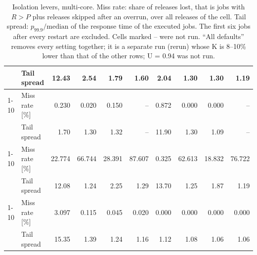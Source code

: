 \begin{table}[ht]
{\begin{tabular}{ll|rrrr|rrrr}
 & Tail spread & 12.43 & 2.54 & 1.79 & 1.60 & 2.04 & 1.30 & 1.30 & 1.19 \\
\cmidrule{1-10}
\multirow[t]{2}{*}{all defaults} & Miss rate [\%] & 0.230 & 0.020 & 0.150 & -- & 0.872 & 0.000 & 0.000 & -- \\
 & Tail spread & 1.70 & 1.30 & 1.32 & -- & 11.90 & 1.30 & 1.09 & -- \\
\cmidrule{1-10}
\multirow[t]{2}{*}{SMT enabled} & Miss rate [\%] & 22.774 & 66.744 & 28.391 & 87.607 & 0.325 & 62.613 & 18.832 & 76.722 \\
 & Tail spread & 12.08 & 1.24 & 2.25 & 1.29 & 13.70 & 1.25 & 1.87 & 1.19 \\
\cmidrule{1-10}
\multirow[t]{2}{*}{pinned tasks} & Miss rate [\%] & 3.097 & 0.115 & 0.045 & 0.020 & 0.000 & 0.000 & 0.000 & 0.000 \\
 & Tail spread & 15.35 & 1.39 & 1.24 & 1.16 & 1.12 & 1.08 & 1.06 & 1.06 \\
\bottomrule
\end{tabular}}
\caption{Isolation levers, multi-core. Miss rate: share of releases lost, that is jobs with $R>P$ plus releases skipped after an overrun, over all releases of the cell. Tail spread: $p_{99.9}/\mathrm{median}$ of the response time of the executed jobs. The first six jobs after every restart are excluded. Cells marked -- were not run. ``All defaults'' removes every setting together; it is a separate run (rerun) whose K is 8--10\% lower than that of the other rows; U = 0.94 was not run.}
\label{tab:rq1-multi-core}
\end{table}
